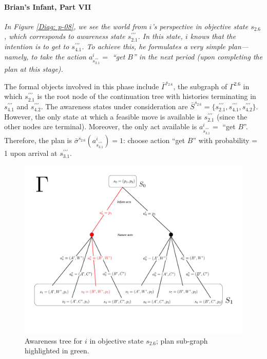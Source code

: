 \documentclass[
11pt,
titlepage,
reqno,
]{article}%
\theoremstyle{definition}
\begin{document}
\paragraph{Brian's Infant, Part VII}
{\em
In Figure \ref{Diag: p-08}, we see the world from $i$'s perspective in objective state $s_{2.6}$, which corresponds to awareness state $s^{\prime\prime\prime}_{2.1}$.
In this state, $i$ knows that the intention is to get to $s^{\prime\prime\prime}_{4.1}$.
To achieve this, he formulates a very simple plan---namely, to take the action $a^i_{s^{\prime\prime\prime}_{3.1}}=$ ``get $B$'' in the next period (upon completing the plan at this stage).

The formal objects involved in this phase include $\bar{\Gamma}^{s_{2.6}}$, the subgraph of $\Gamma^{2.6}$ in which $s^{\prime\prime\prime}_{2.1}$ is the root node of the continuation tree with histories terminating in $s^{\prime\prime\prime}_{4.1}$ and $s^{\prime\prime\prime}_{4.2}$.
The awareness states under consideration are $\bar{S}^{s_{2.6}}=\{s^{\prime\prime\prime}_{2.1},s^{\prime\prime\prime}_{4.1},s^{\prime\prime\prime}_{4.2}\}$.
However, the only state at which a feasible move is available is $s^{\prime\prime\prime}_{2.1}$ (since the other nodes are terminal).
Moreover, the only act available is $a^i_{s^{\prime\prime\prime}_{3.1}}=$ ``get $B$''.
Therefore, the plan is $\bar{\sigma}^{s_{2.6}}(a^i_{s^{\prime\prime\prime}_{3.1}})=1$: choose action ``get $B$'' with probability = 1 upon arrival at $s^{\prime\prime\prime}_{3.1}$.

\begin{figure}[h!]
	\centering
	\includegraphics*[page=9,trim = 0in 0in .5in 0in,scale=.6]{Awareness_Diagrams_All}
	\caption{Awareness tree for $i$ in objective state $s_{2.6}$; plan sub-graph highlighted in green.\label{Diag: p-09}}%
\end{figure}
}
\end{document}
